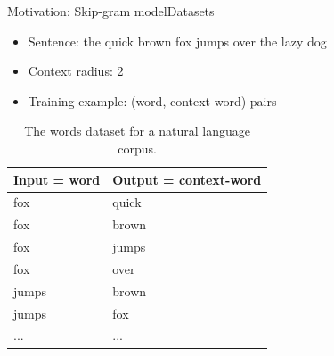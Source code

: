 \documentclass{beamer}
\begin{document}
\begin{frame}{Motivation: Skip-gram model}{Datasets}
	\begin{itemize}
		\item Sentence: the quick brown fox jumps over the lazy dog
		\item Context radius: 2
		\item Training example: (word, context-word) pairs
	\end{itemize}
	\begin{table}[!ht]
		\centering
		\caption{The words dataset for a natural language corpus.}
		\begin{tabularx}{0.8\textwidth}{|X|X|}  \hline
			Input = word & Output = context-word \\ \hline
			fox & quick \\ \hline
			fox & brown \\ \hline
			fox & jumps \\ \hline
			fox & over \\ \hline
			jumps & brown \\ \hline
			jumps & fox \\ \hline
			... & ...       \\ \hline
		\end{tabularx}
		\label{tab:words}
	\end{table}
\end{frame}
\end{document}

